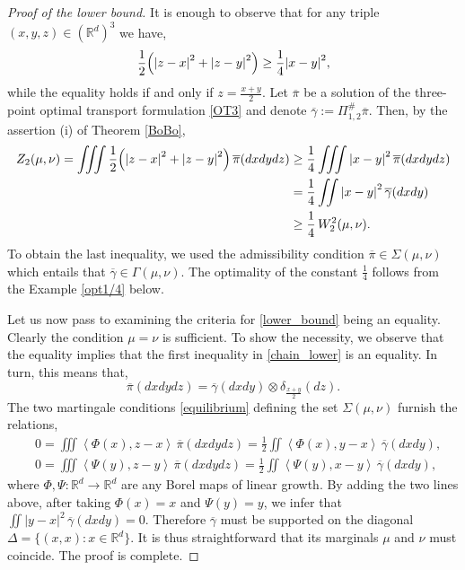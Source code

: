 \documentclass[11pt,reqno]{amsart}
\theoremstyle{definition}
\numberwithin{equation}{section}
\newcommand{\R}{\mathbb{R}}
\newcommand{\Rd}{{\R^d}}
\newcommand{\ov}{\overline}
\newcommand{\pairing}[1]{{\left \langle #1 \right \rangle}}
\newcommand{\abs}[1]{{\left \lvert #1 \right \rvert}}
\begin{document}
\begin{proof}[Proof of the lower bound] 
    It is enough to observe that for any triple $(x,y,z) \in (\Rd)^3$ we have,
    \begin{equation}
        \frac{1}{2} \Bigl( \abs{z-x}^2 + \abs{z-y}^2 \Bigr) \geq \frac{1}{4} \abs{x-y}^2,
    \end{equation}
    while the equality holds if and only if $z=\frac{x+y}{2}$. Let  $\ov\pi$ be a solution of the three-point optimal transport formulation \eqref{OT3} and denote $\ov\gamma := \Pi_{1,2}^\# \ov\pi$. Then, by the assertion (i) of Theorem \ref{BoBo},
    \begin{align}
    	\label{chain_lower}
        Z_2(\mu,\nu) = \iiint \frac{1}{2} \Bigl( \abs{z-x}^2 + \abs{z-y}^2 \Bigr) \, \ov\pi(dxdydz) &\geq \frac{1}{4} \iiint \abs{x-y}^2 \, \ov\pi(dxdydz) \\
        \nonumber
        & = \frac{1}{4}\iint \abs{x-y}^2 \, \ov\gamma(dxdy) \\
        \nonumber
        & \geq \frac{1}{4} \,W_2^2(\mu,\nu).
    \end{align}
    To obtain the last inequality, we used the admissibility condition $\ov\pi \in \Sigma(\mu,\nu)$ which entails that $\ov\gamma \in \Gamma(\mu,\nu)$. 
    The optimality of the constant $\frac{1}{4}$ follows from  the Example \ref{opt1/4} below.
    
    Let us now pass to examining the criteria for \eqref{lower_bound} being an equality. Clearly the condition $\mu = \nu$ is sufficient. To show the necessity, we observe that the equality implies that the first inequality in \eqref{chain_lower} is an equality. In turn, this means that,
    \begin{equation}
    	\ov{\pi}(dxdydz) = \ov{\gamma}(dxdy) \otimes \delta_{\frac{x+y}{2}} (dz).
    \end{equation}
    The two martingale conditions \eqref{equilibrium} defining the set $\Sigma(\mu,\nu)$ furnish the relations,
    \begin{align*}
    	&0 = \iiint \pairing{\Phi(x),z-x} \,\ov\pi(dxdydz) = \frac{1}{2} \iint  \pairing{\Phi(x),y-x} \, \ov{\gamma}(dxdy), \\
    	&0 = \iiint \pairing{\Psi(y),z-y} \,\ov\pi(dxdydz) = \frac{1}{2} \iint  \pairing{\Psi(y),x-y} \, \ov{\gamma}(dxdy),
    \end{align*}
    where   $\Phi,\Psi: \Rd \to \Rd$ are any Borel maps of linear growth.
    By  adding the two lines above, after taking $\Phi(x) = x$ and $\Psi(y)=y$, we infer that $ \iint |y-x|^2 \, \ov{\gamma}(dxdy) =0$. 
    Therefore $\ov \gamma$ must be supported on the diagonal $\Delta=\{(x,x) : x\in\Rd\}$. It is thus straightforward that its marginals $\mu$ and $\nu$ must coincide. 
    The proof is complete.
\end{proof}
\end{document}
